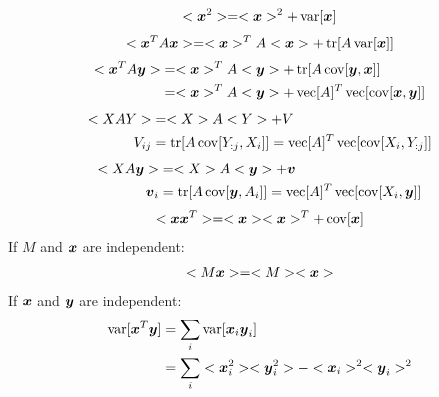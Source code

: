 \documentclass[a4paper]{article}
\begin{document}
\begin{align}
  \label{eq:x2}
  <\bs{x}^2>=<\bs{x}>^2+\Xvar[\bs{x}]
\end{align}
\begin{align}
  \label{eq:xAx}
  <\bs{x}^T A \bs{x}>=<\bs{x}>^T A <\bs{x}> + \Xtr[A \Xvar[\bs{x}]]
\end{align}
\begin{align}
  \label{eq:xAy}
  <\bs{x}^T A \bs{y}>
  &=<\bs{x}>^T A <\bs{y}> + \Xtr[A \Xcov[\bs{y},\bs{x}]] \\
  &=<\bs{x}>^T A <\bs{y}> + \Xvec[A]^T\Xvec[\Xcov[\bs{x},\bs{y}]]
\end{align}
\begin{align}
  \label{eq:XAY}
  <X A Y>&=<X>A<Y>+V \\
  V_{ij}&=\Xtr[A\Xcov[Y_{:j},X_i]]=\Xvec[A]^T\Xvec[\Xcov[X_i,Y_{:j}]] \nonumber
\end{align}
\begin{align}
  \label{eq:XAy}
  <X A \bs{y}>&=<X>A<\bs{y}>+\bs{v} \\
  \bs{v}_{i}&=\Xtr[A\Xcov[\bs{y},A_i]]=\Xvec[A]^T\Xvec[\Xcov[X_i,\bs{y}]] \nonumber
\end{align}
\begin{align}
  \label{eq:xx}
  <\bs{x}\bs{x}^T>=<\bs{x}><\bs{x}>^T+ \Xcov[\bs{x}]
\end{align}
If $M$ and $\boldsymbol{x}$ are independent:
\begin{align}
  \label{eq:Mx}
  <M \Xvx>=<M><\Xvx>
\end{align}
If $\boldsymbol{x}$ and $\boldsymbol{y}$ are independent:
\begin{align}
  \operatorname{var}[\boldsymbol{x}^T\boldsymbol{y}]
  &=\sum_i \operatorname{var}[\boldsymbol{x}_i \boldsymbol{y}_i] \nonumber\\
  &=\sum_i <\boldsymbol{x}_i^2><\boldsymbol{y}_i^2> - <\boldsymbol{x}_i>^2<\boldsymbol{y}_i>^2 \label{eq:vxy}
\end{align}
\end{document}
